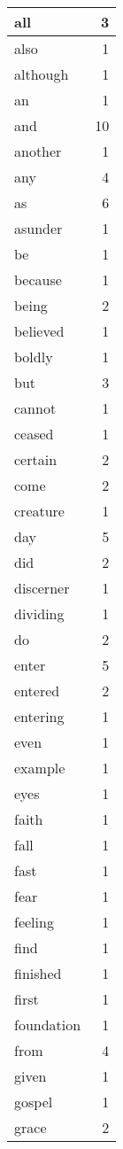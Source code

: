 \begin{center}
\begin{longtable}{l|r}
all & 3\\ \hline 
also & 1\\ \hline 
although & 1\\ \hline 
an & 1\\ \hline 
and & 10\\ \hline 
another & 1\\ \hline 
any & 4\\ \hline 
as & 6\\ \hline 
asunder & 1\\ \hline 
be & 1\\ \hline 
because & 1\\ \hline 
being & 2\\ \hline 
believed & 1\\ \hline 
boldly & 1\\ \hline 
but & 3\\ \hline 
cannot & 1\\ \hline 
ceased & 1\\ \hline 
certain & 2\\ \hline 
come & 2\\ \hline 
creature & 1\\ \hline 
day & 5\\ \hline 
did & 2\\ \hline 
discerner & 1\\ \hline 
dividing & 1\\ \hline 
do & 2\\ \hline 
enter & 5\\ \hline 
entered & 2\\ \hline 
entering & 1\\ \hline 
even & 1\\ \hline 
example & 1\\ \hline 
eyes & 1\\ \hline 
faith & 1\\ \hline 
fall & 1\\ \hline 
fast & 1\\ \hline 
fear & 1\\ \hline 
feeling & 1\\ \hline 
find & 1\\ \hline 
finished & 1\\ \hline 
first & 1\\ \hline 
foundation & 1\\ \hline 
from & 4\\ \hline 
given & 1\\ \hline 
gospel & 1\\ \hline 
grace & 2\\ \hline 

\end{longtable}
\end{center}
